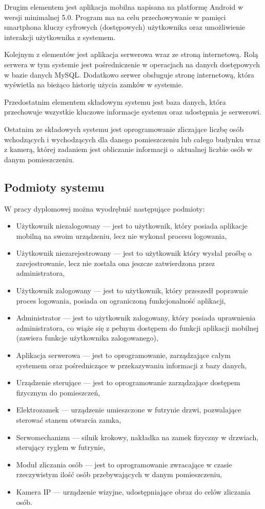 \documentclass[twoside,10pt]{article}
\begin{document}
Drugim elementem jest aplikacja mobilna napisana na platformę Android w wersji minimalnej 5.0. Program ma na celu przechowywanie w pamięci smartphona kluczy cyfrowych (dostępowych) użytkownika oraz umożliwienie interakcji użytkownika z systemem.

Kolejnym z elementów jest aplikacja serwerowa wraz ze stroną internetową. Rolą serwera w tym systemie jest pośredniczenie w operacjach na danych dostępowych w bazie danych MySQL. Dodatkowo serwer obsługuje stronę internetową, która wyświetla na bieżąco historię użycia zamków w systemie.

Przedostatnim elementem składowym systemu jest baza danych, która przechowuje wszystkie kluczowe informacje systemu oraz udostępnia je serwerowi.

Ostatnim ze składowych systemu jest oprogramowanie zliczające liczbę osób wchodzących i wychodzących dla danego pomieszczeniu lub całego budynku wraz z kamerą, której zadaniem jest obliczanie informacji o~aktualnej liczbie osób w danym pomieszczeniu. 

\subsection{Podmioty systemu} 
W pracy dyplomowej można wyodrębnić następujące podmioty:
\begin{itemize}
\item {Użytkownik niezalogowany} --- jest to użytkownik, który posiada aplikacje mobilną na swoim urządzeniu, lecz nie wykonał procesu logowania,
\item {Użytkownik niezarejestrowany} --- jest to użytkownik który wysłał prośbę o zarejestrowanie, lecz nie została ona jeszcze zatwierdzona przez administratora,
\item {Użytkownik zalogowany} --- jest to użytkownik, który przeszedł poprawnie proces logowania, posiada on ograniczoną funkcjonalność aplikacji,
\item {Administrator} --- jest to użytkownik zalogowany, który posiada uprawnienia administratora, co wiąże się z pełnym dostępem do funkcji aplikacji mobilnej (zawiera funkcje użytkownika zalogowanego),
\item {Aplikacja serwerowa} --- jest to oprogramowanie, zarządzające całym systemem oraz pośredniczące w przekazywaniu informacji z bazy danych,
\item {Urządzenie sterujące} --- jest to oprogramowanie zarządzające dostępem fizycznym do pomieszczeń,
\item {Elektrozamek} --- urządzenie umieszczone w futrynie drzwi, pozwalające sterować stanem otwarcia zamka,
\item {Serwomechanizm} --- silnik krokowy, nakładka na zamek fizyczny w drzwiach, sterujący ryglem w futrynie,
\item {Moduł zliczania osób} --- jest to oprogramowanie zwracające w czasie rzeczywistym ilość osób przebywających w danym pomieszczeniu,
\item {Kamera IP} --- urządzenie wizyjne, udostępniające obraz do celów zliczania osób.
\end{itemize}
\end{document}
